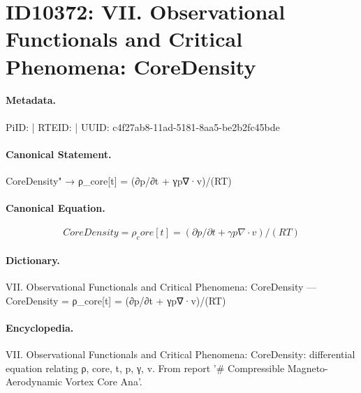 \section*{ID10372: VII. Observational Functionals and Critical Phenomena: CoreDensity}
\paragraph{Metadata.}
PiID:  | RTEID:  | UUID: c4f27ab8-11ad-5181-8aa5-be2b2fc45bde

\paragraph{Canonical Statement.}
CoreDensity" → ρ\_core[t] = (∂p/∂t + γp∇·v)/(RT)

\paragraph{Canonical Equation.}
\[
CoreDensity = ρ_core[t] = (∂p/∂t + γp∇·v)/(RT)
\]

\paragraph{Dictionary.}
VII. Observational Functionals and Critical Phenomena: CoreDensity — CoreDensity = ρ\_core[t] = (∂p/∂t + γp∇·v)/(RT)

\paragraph{Encyclopedia.}
VII. Observational Functionals and Critical Phenomena: CoreDensity: differential equation relating ρ, core, t, p, γ, v. From report '\# Compressible Magneto-Aerodynamic Vortex Core Ana'.
